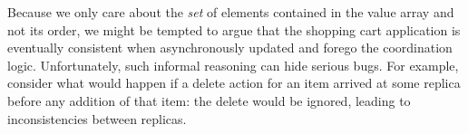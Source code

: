 
Because we only care about the \emph{set} of elements contained in the value array
and not its order, we might be tempted to argue that 
the shopping cart application is eventually consistent
when asynchronously updated and forego the coordination logic.  Unfortunately,
such informal reasoning can hide serious bugs. For example, consider what would happen if a delete action for an item arrived at some replica
before any addition of that item: the delete would be ignored, leading to
inconsistencies between replicas.

